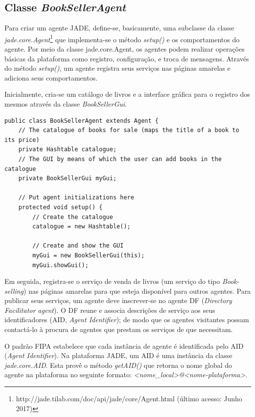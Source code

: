 \subsection{Classe \textit{BookSellerAgent}}

Para criar um agente JADE, define-se, basicamente, uma subclasse da classe \textit{jade.core.Agent}\footnote{http://jade.tilab.com/doc/api/jade/core/Agent.html (último acesso: Junho 2017)} que implementa-se o método \textit{setup()} e os comportamentos do agente. Por meio da  classe {jade.core.Agent}, os agentes podem realizar operações básicas da plataforma como registro, configuração, e troca de mensagens. Através do método \textit{setup()}, um agente registra seus serviços nas páginas amarelas e adiciona seus comportamentos.

Inicialmente, cria-se um catálogo de livros e a interface gráfica para o registro dos mesmos através da classe \textit{BookSellerGui}.

\begin{lstlisting}[firstnumber=37]
public class BookSellerAgent extends Agent {
	// The catalogue of books for sale (maps the title of a book to its price)
	private Hashtable catalogue;
	// The GUI by means of which the user can add books in the catalogue
	private BookSellerGui myGui;

	// Put agent initializations here
	protected void setup() {
		// Create the catalogue
		catalogue = new Hashtable();

		// Create and show the GUI 
		myGui = new BookSellerGui(this);
		myGui.showGui();
\end{lstlisting}

Em seguida, registra-se o serviço de venda de livros (um serviço do tipo \textit{Book-selling}) nas páginas amarelas para que esteja disponível para outros agentes. Para publicar seus serviços, um agente deve inscrever-se no agente DF (\textit{Directory Facilitator agent}). O DF reune e associa descrições de serviço aos seus identificadores (AID, \textit{Agent Identifier}); de modo que os agentes visitantes possam contactá-lo à procura de agentes que prestam os serviços de que necessitam. 

O padrão FIPA estabelece que cada instância de agente é identificada pelo AID (\textit{Agent Identifier}). Na plataforma JADE, um AID é uma instância da classe \textit{jade.core.AID}. Esta provê o método \textit{getAID()} que retorna o nome global do agente na plataforma no seguinte formato: \textit{<nome\_local>@<nome-plataforma>}.

